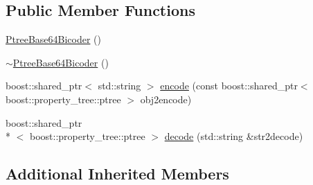 \subsection*{Public Member Functions}
\begin{DoxyCompactItemize}
\item 
\hyperlink{classkisscpp_1_1_ptree_base64_bicoder_a7ef5902a63627323ee9ed4d70e944705}{Ptree\-Base64\-Bicoder} ()
\item 
\hyperlink{classkisscpp_1_1_ptree_base64_bicoder_a914c3bec7a67be1d3ae14d85a5e16439}{$\sim$\-Ptree\-Base64\-Bicoder} ()
\item 
boost\-::shared\-\_\-ptr$<$ std\-::string $>$ \hyperlink{classkisscpp_1_1_ptree_base64_bicoder_a7f4bbf8b4b4626fa9228118889fd51d2}{encode} (const boost\-::shared\-\_\-ptr$<$ boost\-::property\-\_\-tree\-::ptree $>$ obj2encode)
\item 
boost\-::shared\-\_\-ptr\\*
$<$ boost\-::property\-\_\-tree\-::ptree $>$ \hyperlink{classkisscpp_1_1_ptree_base64_bicoder_a38542388704d80131d4a505646439715}{decode} (std\-::string \&str2decode)
\end{DoxyCompactItemize}
\subsection*{Additional Inherited Members}


